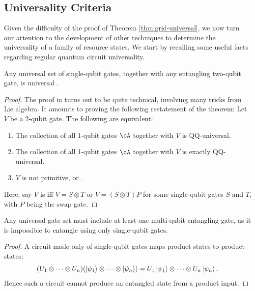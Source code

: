 \subsection{Universality Criteria}

Given the difficulty of the proof of Theorem \ref{thm:grid-universal}, we now turn our attention to the development of other techniques to determine the universality of a family of resource states. We start by recalling some useful facts regarding regular quantum circuit universality.

\begin{fact}
\label{fact:1-qubit-and-entangling-universal}
Any universal set of single-qubit gates, together with any entangling two-qubit
gate, is universal \cite{1qubit-entangling-universal}.
\end{fact}

\begin{proof}
The proof in \cite{1qubit-entangling-universal} turns out to be quite technical, involving many tricks from Lie algebra. It amounts to proving the following restatement of the theorem: Let $V$ be a 2-qubit gate. The following are equivalent:
\begin{enumerate}
    \item The collection of all 1-qubit gates $\cA$ together with $V$ is QQ-universal.
    \item The collection of all 1-qubit gates $\cA$ together with $V$ is exactly QQ-universal.
    \item $V$ is not primitive, or .
\end{enumerate}
Here, say $V$ is  iff $V = S \otimes T$ or $V = (S \otimes T)P$ for some single-qubit gates $S$ and $T$, with $P$ being the swap gate.
\end{proof}

\begin{theorem}
\label{thm:any-universal-need-entanglement}
Any universal gate set must include at least one multi-qubit entangling gate, as it is impossible to entangle using only single-qubit gates.
\end{theorem}

\begin{proof}
A circuit made only of single-qubit gates maps product states to product states:
\[
(U_1\otimes\cdots\otimes U_n)(\ket{\psi_1}\otimes\cdots\otimes\ket{\psi_n})
=
U_1\ket{\psi_1}\otimes\cdots\otimes U_n\ket{\psi_n}.
\]
Hence such a circuit cannot produce an entangled state from a product input.
\end{proof}

